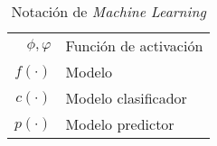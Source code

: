 \begin{table}[H]
\begin{center}
\begin{tabularx}{\textwidth}{|r|X|}
            $ \phi ,\varphi $                                                                     & Función de activación                                                                                                                                                   \\
            $ f\left(\cdot\right) $                                                               & Modelo                                                                                                                                                                  \\
            $ {c}\left(\cdot\right) $                                                             & Modelo clasificador                                                                                                                                                     \\
            $ {p}\left(\cdot\right) $                                                             & Modelo predictor                                                                                                                                                        \\
            \hline
        \end{tabularx}
        \caption{Notación de \textit{Machine Learning}}
        \label{tab:notation-part-ml}
    \end{center}
\end{table}

